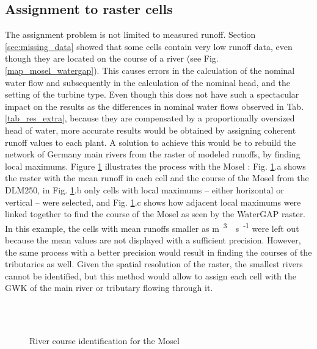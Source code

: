 \subsection{Assignment to raster cells}
\label{sub:imp_assign_cell}
The assignment problem is not limited to measured runoff. Section \ref{sec:missing_data} showed that some cells contain very low runoff data, even though they are located on the course of a river (see Fig. \ref{map_mosel_watergap}). This causes errors in the calculation of the nominal water flow and subsequently in the calculation of the nominal head, and the setting of the turbine type. Even though this does not have such a spectacular impact on the results as the differences in nominal water flows observed in Tab. \ref{tab_res_extra}, because they are compensated by a proportionally oversized head of water, more accurate results would be obtained by assigning coherent runoff values to each plant. \newline
A solution to achieve this would be to rebuild the network of Germany main rivers from the raster of modeled runoffs, by finding local maximums. Figure \ref{imp_mosel} illustrates the process with the Mosel : Fig. \ref{imp_mosel}.a shows the raster with the mean runoff in each cell and the course of the Mosel from the DLM250, in Fig. \ref{imp_mosel}.b only cells with local maximums -- either horizontal or vertical -- were selected, and Fig. \ref{imp_mosel}.c shows how adjacent local maximums were linked together to find the course of the Mosel as seen by the WaterGAP raster. \newline
In this example, the cells with mean runoffs smaller as \unit[1]{m\textsuperscript{3}\textperiodcentered s\textsuperscript{-1}} were left out because the mean values are not displayed with a sufficient precision. However, the same process with a better precision would result in finding the courses of the tributaries as well. Given the spatial resolution of the raster, the smallest rivers cannot be identified, but this method would allow to assign each cell with the GWK of the main river or tributary flowing through it.

\begin{figure}[H]
\begin{center}
   \\
   \\
\end{center}
\caption{River course identification for the Mosel}
\label{imp_mosel}
\end{figure}

